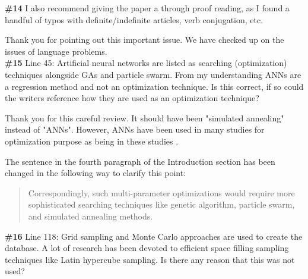 \documentclass{ar2rc}
\begin{document}

    \Comment \textbf{\#14} I also recommend giving the paper a through proof reading, as I
    found a handful of typos with definite/indefinite articles, verb
    conjugation, etc.

    \Response Thank you for pointing out this important issue. We have checked up on the issues of language problems.\\


    \Comment \textbf{\#15} Line 45: Artificial neural networks are listed as searching
    (optimization) techniques alongside GAs and particle swarm. From my
    understanding ANNs are a regression method and not an optimization
    technique. Is this correct, if so could the writers reference how they are
    used as an optimization technique?

    \Response Thank you for this careful review. It should have been "simulated annealing" instead of "ANNs". However, ANNs have been used in many studies for optimization purpose as being in these studies \cite{Kim2018, Kim2020}.

    The sentence in the fourth paragraph of the Introduction section has been changed in the following way to clarify this point:\\

    \begin{quote}
        Correspondingly, such multi-parameter optimizations would require more sophisticated searching techniques like genetic algorithm, particle swarm, and simulated annealing methods.
    \end{quote}


    \Comment \textbf{\#16} Line 118: Grid sampling and Monte Carlo approaches are used to
    create the database. A lot of research has been devoted to efficient space
    filling sampling techniques like Latin hypercube sampling. Is there any
    reason that this was not used?
\end{document}
